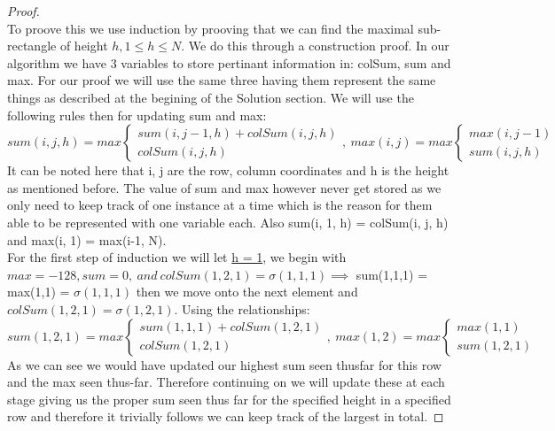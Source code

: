 \documentclass[12pt]{article}
\begin{document}
\begin{proof}
~ \\ \indent To proove this we use induction by prooving that we can find the maximal sub-
rectangle of height $h, 1 \leq h \leq N$. We do this through a construction proof. In our
algorithm we have 3 variables to store pertinant information in: colSum, sum and
max. For our proof we will use the same three having them represent the same things
as described at the begining of the Solution section. We will use the following rules then
for updating sum and max:
\[  sum(i, j, h) = max
        \begin{cases}
            sum(i, j-1, h) + colSum(i, j, h) \\
            colSum(i, j, h)
        \end{cases}
    ,\ max(i, j) = max
        \begin{cases}
            max(i, j-1) \\
            sum(i, j, h)
        \end{cases}
\]
It can be noted here that i, j are the row, column coordinates and h is the height as
mentioned before. The value of sum and max however never get stored as we only
need to keep track of one instance at a time which is the reason for them able to be
represented with one variable each. Also sum(i, 1, h) = colSum(i, j, h) and max(i, 1)
= max(i-1, N). \\
For the first step of induction we will let \underline{h = 1}, we begin with $max = -128, sum =
0,\ and\ colSum(1,2,1) = \sigma(1,1,1) \implies$ sum(1,1,1) = max(1,1) = $\sigma(1,1,1)$ then we move
onto the next element and $colSum(1,2,1) = \sigma(1,2,1)$. Using the relationships:
\[  sum(1, 2, 1) = max
        \begin{cases}
            sum(1, 1, 1) + colSum(1, 2, 1) \\
            colSum(1, 2, 1)
        \end{cases}
    ,\ max(1, 2) = max
        \begin{cases}
            max(1, 1) \\
            sum(1, 2, 1)
        \end{cases}
\]
As we can see we would have updated our highest sum seen thusfar for this row and
the max seen thus-far. Therefore continuing on we will update these at each stage
giving us the proper sum seen thus far for the specified height in a specified row and
therefore it trivially follows we can keep track of the largest in total.
\end{proof}
\end{document}
